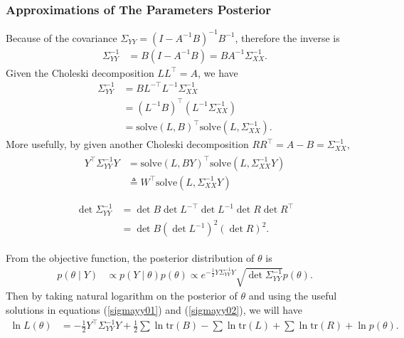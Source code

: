 \subsubsection{Approximations of The Parameters Posterior}

Because of the covariance  $\Sigma_{YY} =  (I-A^{-1}B)^{-1}B^{-1}$, therefore the inverse is 
\begin{align*}
\Sigma_{YY}^{-1} &= B(I-A^{-1}B)= BA^{-1}\Sigma_{XX}^{-1}.
\end{align*}
Given the Choleski decomposition $LL^\top = A$, we have
\begin{align*}
\Sigma_{YY}^{-1} &=BL^{-\top}L^{-1}\Sigma_{XX}^{-1}\\
&=(L^{-1}B)^\top(L^{-1}\Sigma_{XX}^{-1})\\
&=\mbox{solve}(L,B)^\top\mbox{solve}(L,\Sigma_{XX}^{-1}).
\end{align*}
More usefully, by given another Choleski decomposition $RR^\top=A-B=\Sigma_{XX}^{-1}$,
\begin{align}\label{sigmayy01}
\begin{split}
Y^\top \Sigma_{YY}^{-1} Y &= \mbox{solve}(L,BY)^\top\mbox{solve}(L,\Sigma_{XX}^{-1}Y)\\
&\triangleq W^\top \mbox{solve}(L,\Sigma_{XX}^{-1}Y)\\
\end{split}
\end{align}
\begin{align}\label{sigmayy02}
\begin{split}
\det\Sigma_{YY}^{-1} &= \det B \det L^{-\top}\det L^{-1}\det R\det R^\top\\
&= \det B(\det L^{-1})^2(\det R)^2.
\end{split}
\end{align}

From the objective function, the posterior distribution of $\theta$ is 
\begin{align*}
p(\theta \mid Y) &\propto p(Y\mid\theta)p(\theta) \propto e^{-\frac{1}{2} Y \Sigma_{YY}^{-1} Y } \sqrt{\det \Sigma_{YY}^{-1}} p(\theta).
\end{align*}
Then by taking natural logarithm on the posterior of $\theta$ and using the useful solutions in equations (\ref{sigmayy01}) and (\ref{sigmayy02}), we will have
\begin{align}\label{logL}
\ln L(\theta) &= -\frac{1}{2}Y^\top\Sigma_{YY}^{-1}Y+\frac{1}{2}\sum\ln\mbox{tr}(B)-\sum\ln\mbox{tr}(L)+\sum\ln\mbox{tr}(R) + \ln p(\theta).
\end{align}



